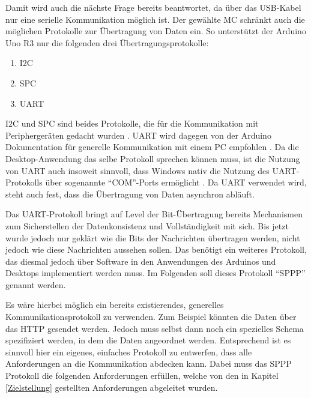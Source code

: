 Damit wird auch die nächste Frage bereits beantwortet, da über das USB-Kabel nur eine serielle Kommunikation möglich ist.
Der gewählte \ac{MC} schränkt auch die möglichen Protokolle zur Übertragung von Daten ein.
So unterstützt der Arduino Uno R3 nur die folgenden drei Übertragungsprotokolle:

\begin{enumerate}
    \item \ac{I2C}
    \item \ac{SPC}
    \item \ac{UART}
\end{enumerate}

\ac{I2C} und \ac{SPC} sind beides Protokolle, die für die Kommunikation mit Periphergeräten gedacht wurden \cites[vgl.][]{zsh.InterIntegratedCircuitI2C.24}{as.ArduinoSerialPeripheral.23}.
\ac{UART} wird dagegen von der Arduino Dokumentation für generelle Kommunikation mit einem PC empfohlen \cite[vgl.][]{sie.UniversalAsynchronousReceiverTransmitter.23}.
Da die Desktop-Anwendung das selbe Protokoll sprechen können muss, ist die Nutzung von \ac{UART} auch insoweit sinnvoll, dass Windows nativ die Nutzung des \ac{UART}-Protokolls über sogenannte \enquote{COM}-Ports ermöglicht \cite[vgl.][]{mar.ConfigurationCOMPorts.22}. \newline
Da \ac{UART} verwendet wird, steht auch fest, dass die Übertragung von Daten asynchron abläuft.

Das \ac{UART}-Protokoll bringt auf Level der Bit-Übertragung bereits Mechanismen zum Sicherstellen der Datenkonsistenz und Vollständigkeit mit sich.
Bis jetzt wurde jedoch nur geklärt wie die Bits der Nachrichten übertragen werden, nicht jedoch wie diese Nachrichten aussehen sollen.
Das benötigt ein weiteres Protokoll, das diesmal jedoch über Software in den Anwendungen des Arduinos und Desktops implementiert werden muss.
Im Folgenden soll dieses Protokoll \enquote{\ac{SPPP}} genannt werden.

Es wäre hierbei möglich ein bereits existierendes, generelles Kommunikationsprotokoll zu verwenden.
Zum Beispiel könnten die Daten über das \acf{HTTP} gesendet werden.
Jedoch muss selbst dann noch ein spezielles Schema spezifiziert werden, in dem die Daten angeordnet werden. \newline
Entsprechend ist es sinnvoll hier ein eigenes, einfaches Protokoll zu entwerfen, dass alle Anforderungen an die Kommunikation abdecken kann.
Dabei muss das \ac{SPPP} Protokoll die folgenden Anforderungen erfüllen, welche von den in Kapitel \ref{Zielstellung} gestellten Anforderungen abgeleitet wurden.

